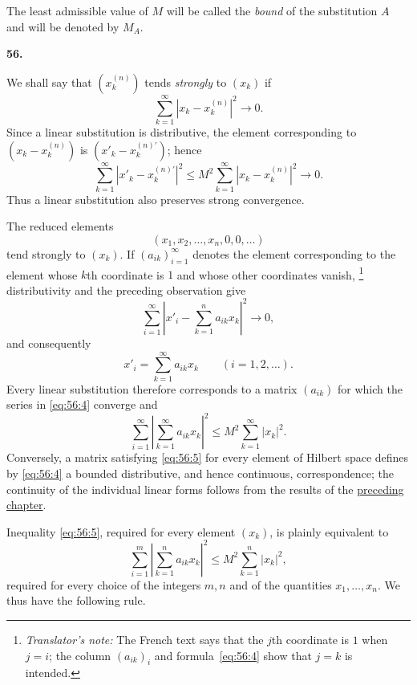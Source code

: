 \documentclass[
  paper=b5,
  fontsize=13pt,
  twoside=true,
  open=any,
  bookmarkpackage=false,
  chapterprefix=true,
  headings=normal
]{scrbook}
\theoremstyle{definition}
\newcommand{\numberedparagraph}[1]{%
  \par\medskip\phantomsection\label{sec:#1}%
  \noindent\textbf{#1.}\enspace
}
\newcounter{translatornote}
\newcommand{\translatornotelabel}{T\arabic{translatornote}}
\newcommand{\translatornote}[1]{%
  \stepcounter{translatornote}%
  \begingroup
    \edef\savedfootnotenumber{\number\value{footnote}}%
    \renewcommand{\thefootnote}{\translatornotelabel}%
    \footnote{\emph{Translator's note:} #1}%
    \setcounter{footnote}{\savedfootnotenumber}%
  \endgroup
}
\begin{document}
The least admissible value of $M$ will be called the \emph{bound} of the
substitution $A$ and will be denoted by $M_A$.

\numberedparagraph{56}
We shall say that $(x_k^{(n)})$ tends \emph{strongly} to $(x_k)$ if
\begin{equation}
  \sum_{k=1}^{\infty}|x_k-x_k^{(n)}|^2\longrightarrow0.
  \tag{2}\label{eq:56:2}
\end{equation}
Since a linear substitution is distributive, the element corresponding to
$(x_k-x_k^{(n)})$ is $(x'_k-x_k^{(n)\prime})$; hence
\[
  \sum_{k=1}^{\infty}|x'_k-x_k^{(n)\prime}|^2
  \leq M^2\sum_{k=1}^{\infty}|x_k-x_k^{(n)}|^2\longrightarrow0.
\]
Thus a linear substitution also preserves strong convergence.

The reduced elements
\[
  (x_1,x_2,\ldots,x_n,0,0,\ldots)
\]
tend strongly to $(x_k)$. If $(a_{ik})_{i=1}^{\infty}$ denotes the element
corresponding to the element whose $k$th coordinate is $1$ and whose other
coordinates vanish,\translatornote{The French text says that the $j$th
coordinate is $1$ when $j=i$; the column $(a_{ik})_i$ and
formula~\eqref{eq:56:4} show
that $j=k$ is intended.} distributivity and the preceding observation give
\begin{equation}
  \sum_{i=1}^{\infty}
  \left|x'_i-\sum_{k=1}^{n}a_{ik}x_k\right|^2\longrightarrow0,
  \tag{3}\label{eq:56:3}
\end{equation}
and consequently
\begin{equation}
  x'_i=\sum_{k=1}^{\infty}a_{ik}x_k
  \qquad(i=1,2,\ldots).
  \tag{4}\label{eq:56:4}
\end{equation}
Every linear substitution therefore corresponds to a matrix $(a_{ik})$
for which the series in \eqref{eq:56:4} converge and
\begin{equation}
  \sum_{i=1}^{\infty}
    \left|\sum_{k=1}^{\infty}a_{ik}x_k\right|^2
  \leq M^2\sum_{k=1}^{\infty}|x_k|^2.
  \tag{5}\label{eq:56:5}
\end{equation}
Conversely, a matrix satisfying \eqref{eq:56:5} for every element of
Hilbert space defines by \eqref{eq:56:4} a bounded distributive, and hence
continuous, correspondence; the continuity of the individual linear forms
follows from the results of the \hyperref[chap:3]{preceding chapter}.

Inequality \eqref{eq:56:5}, required for every element $(x_k)$, is plainly
equivalent to
\[
  \sum_{i=1}^{m}\left|\sum_{k=1}^{n}a_{ik}x_k\right|^2
  \leq M^2\sum_{k=1}^{n}|x_k|^2,
\]
required for every choice of the integers $m,n$ and of the quantities
$x_1,\ldots,x_n$. We thus have the following rule.
\end{document}
